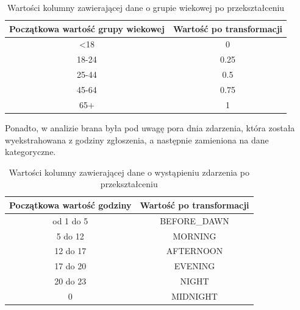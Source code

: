 \documentclass{classrep}
\begin{document}
{{{                \begin{table}[!htbp]
                    \small
                    \centering
                    \begin{tabular}{|c|c|}
                        \hline
                        Początkowa wartość grupy wiekowej & Wartość po transformacji \\ \hline
                        <18 & 0 \\
                        18-24 & 0.25 \\
                         25-44 & 0.5 \\
                        45-64 & 0.75 \\ 
                        65+ & 1 \\ \hline
                    \end{tabular}
                    \caption{Wartości kolumny zawierającej dane o grupie wiekowej po przekształceniu}
                    \label{trans_age}
                \end{table}
                \FloatBarrier

                Ponadto, w analizie brana była pod uwagę pora dnia zdarzenia, która
                została wyekstrahowana z godziny zgłoszenia, a następnie zamieniona na
                dane kategoryczne.
                
                \begin{table}[!htbp]
                    \small
                    \centering
                    \begin{tabular}{|c|c|}
                        \hline
                        Początkowa wartość godziny & Wartość po transformacji \\ \hline
                        od 1 do 5 & BEFORE\_DAWN \\
                        5 do 12 & MORNING \\
                         12 do 17 & AFTERNOON \\
                        17 do 20 & EVENING\\
                        20 do 23 & NIGHT\\ 
                        0 & MIDNIGHT \\ \hline
                    \end{tabular}
                    \caption{Wartości kolumny zawierającej dane o wystąpieniu zdarzenia po przekształceniu}
                    \label{trans_occurance}
                \end{table}
                \FloatBarrier

}}}
\end{document}
